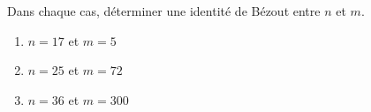 \documentclass[a4paper,12pt]{article}
\begin{document}
% 
% 
% 
% 
% 
% 
% 
% 
% 

\begin{exercice}[title=Exercice 9 $\quad \star \quad$ {[Calculer]}]
Dans chaque cas, déterminer une identité de Bézout entre $n$ et $m$.
\begin{enumerate}
    \item $n = 17$ et $m = 5$
    \item $n = 25$ et $m = 72$
    \item $n = 36$ et $m = 300$
\end{enumerate}
\end{exercice}
\end{document}
